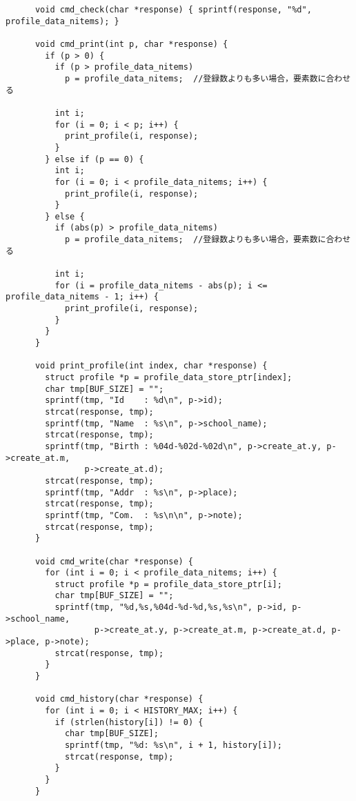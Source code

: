 \documentclass[11pt]{jsarticle}
\begin{document}
\begin{verbatim}
      void cmd_check(char *response) { sprintf(response, "%d", profile_data_nitems); }

      void cmd_print(int p, char *response) {
        if (p > 0) {
          if (p > profile_data_nitems)
            p = profile_data_nitems;  //登録数よりも多い場合，要素数に合わせる
      
          int i;
          for (i = 0; i < p; i++) {
            print_profile(i, response);
          }
        } else if (p == 0) {
          int i;
          for (i = 0; i < profile_data_nitems; i++) {
            print_profile(i, response);
          }
        } else {
          if (abs(p) > profile_data_nitems)
            p = profile_data_nitems;  //登録数よりも多い場合，要素数に合わせる
      
          int i;
          for (i = profile_data_nitems - abs(p); i <= profile_data_nitems - 1; i++) {
            print_profile(i, response);
          }
        }
      }
      
      void print_profile(int index, char *response) {
        struct profile *p = profile_data_store_ptr[index];
        char tmp[BUF_SIZE] = "";
        sprintf(tmp, "Id    : %d\n", p->id);
        strcat(response, tmp);
        sprintf(tmp, "Name  : %s\n", p->school_name);
        strcat(response, tmp);
        sprintf(tmp, "Birth : %04d-%02d-%02d\n", p->create_at.y, p->create_at.m,
                p->create_at.d);
        strcat(response, tmp);
        sprintf(tmp, "Addr  : %s\n", p->place);
        strcat(response, tmp);
        sprintf(tmp, "Com.  : %s\n\n", p->note);
        strcat(response, tmp);
      }
      
      void cmd_write(char *response) {
        for (int i = 0; i < profile_data_nitems; i++) {
          struct profile *p = profile_data_store_ptr[i];
          char tmp[BUF_SIZE] = "";
          sprintf(tmp, "%d,%s,%04d-%d-%d,%s,%s\n", p->id, p->school_name,
                  p->create_at.y, p->create_at.m, p->create_at.d, p->place, p->note);
          strcat(response, tmp);
        }
      }
      
      void cmd_history(char *response) {
        for (int i = 0; i < HISTORY_MAX; i++) {
          if (strlen(history[i]) != 0) {
            char tmp[BUF_SIZE];
            sprintf(tmp, "%d: %s\n", i + 1, history[i]);
            strcat(response, tmp);
          }
        }
      }
\end{verbatim}
\end{document}
